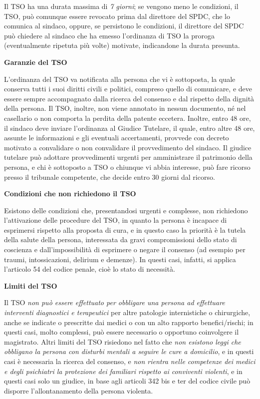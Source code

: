 \documentclass[]{article}
\begin{document}
Il TSO ha una durata massima di \emph{7 giorni}; se vengono meno le
condizioni, il TSO, può comunque essere revocato prima dal direttore del
SPDC, che lo comunica al sindaco, oppure, se persistono le condizioni,
il direttore del SPDC può chiedere al sindaco che ha emesso l'ordinanza
di TSO la proroga (eventualmente ripetuta più volte) motivate,
indicandone la durata presunta.

\textbf{Garanzie del TSO}

L'ordinanza del TSO va notificata alla persona che vi è sottoposta, la
quale conserva tutti i suoi diritti civili e politici, compreso quello
di comunicare, e deve essere sempre accompagnato dalla ricerca del
consenso e dal rispetto della dignità della persona. Il TSO, inoltre,
non viene annotato in nessun documento, né nel casellario o non comporta
la perdita della patente eccetera. Inoltre, entro 48 ore, il sindaco
deve inviare l'ordinanza al Giudice Tutelare, il quale, entro altre 48
ore, assunte le informazioni e gli eventuali accertamenti, provvede con
decreto motivato a convalidare o non convalidare il provvedimento del
sindaco. Il giudice tutelare può adottare provvedimenti urgenti per
amministrare il patrimonio della persona, e chi è sottoposto a TSO o
chiunque vi abbia interesse, può fare ricorso presso il tribunale
competente, che decide entro 30 giorni dal ricorso.

\textbf{Condizioni che non richiedono il TSO}

Esistono delle condizioni che, presentandosi urgenti e complesse, non
richiedono l'attivazione delle procedure del TSO, in quanto la persona è
incapace di esprimersi rispetto alla proposta di cura, e in questo caso
la priorità è la tutela della salute della persona, interessata da gravi
compromissioni dello stato di coscienza e dall'impossibilità di
esprimere o negare il consenso (ad esempio per traumi, intossicazioni,
delirium e demenze). In questi casi, infatti, si applica l'articolo 54
del codice penale, cioè lo stato di necessità.

\textbf{Limiti del TSO}

Il TSO \emph{non può essere effettuato per obbligare una persona ad
effettuare interventi diagnostici e terapeutici} per altre patologie
internistiche o chirurgiche, anche se indicate o prescritte dai medici o
con un alto rapporto benefici/rischi; in questi casi, molto complessi,
può essere necessario o opportuno coinvolgere il magistrato. Altri
limiti del TSO risiedono nel fatto che \emph{non esistono leggi che
obbligano la persona con disturbi mentali a seguire le cure a
domicilio}, e in questi casi è necessaria la ricerca del consenso, e
\emph{non rientra nelle competenze dei medici e degli psichiatri la
protezione dei familiari rispetto ai conviventi violenti}, e in questi
casi solo un giudice, in base agli articoli 342 bis e ter del codice
civile può disporre l'allontanamento della persona violenta.
\end{document}
